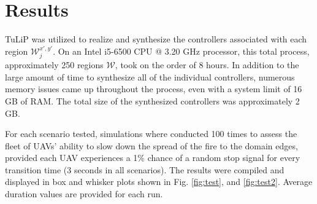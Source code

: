 \documentclass{ieeeaccess}
\begin{document}
\section{Results}

TuLiP \cite{c12} was utilized to realize and synthesize the controllers associated with each region $\mathcal{W}_j^{x',y'}$. On an Intel i5-6500 CPU @ 3.20 GHz processor, this total process, approximately 250 regions $\mathcal{W}$, took on the order of 8 hours. In addition to the large amount of time to synthesize all of the individual controllers, numerous memory issues came up throughout the process, even with a system limit of 16 GB of RAM. The total size of the synthesized controllers was approximately 2 GB.

For each scenario tested, simulations where conducted 100 times to assess the fleet of UAVs' ability to slow down the spread of the fire to the domain edges, provided each UAV experiences a 1\% chance of a random stop signal for every transition time (3 seconds in all scenarios). The results were compiled and displayed in box and whisker plots shown in Fig. \ref{fig:test}, and \ref{fig:test2}. Average duration values are provided for each run.
\end{document}

